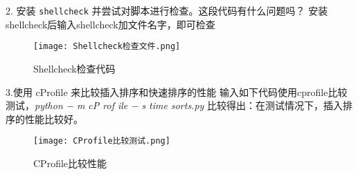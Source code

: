 \documentclass{article}
\begin{document}
2. 安装 \verb|shellcheck| 并尝试对脚本进行检查。这段代码有什么问题吗？ \newline
安装shellcheck后输入shellcheck加文件名字，即可检查
\begin{figure}[!h]
    \centering
    \texttt{[image: Shellcheck检查文件.png]}
    \caption{Shellcheck检查代码}
    \label{fig:enter-label}
\end{figure}


3.使用 cProfile 来比较插入排序和快速排序的性能\newline
输入如下代码使用cprofile比较测试，\textit{python }\textit{− }\textit{m cP rof ile }\textit{− }\textit{s time sorts.py }
比较得出：在测试情况下，插入排序的性能比较好。
\begin{figure}[!h]
    \centering
    \texttt{[image: CProfile比较测试.png]}
    \caption{CProfile比较性能}
    \label{fig:enter-label}
\end{figure}
\end{document}
